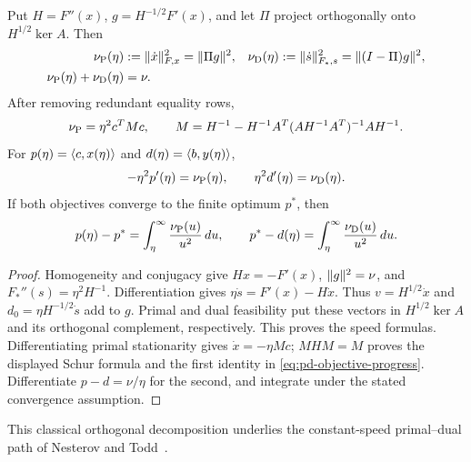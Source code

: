 \begin{proposition}
\label{prop:pd-velocity}
Put $H=F''(x)$, $g=H^{-1/2}F'(x)$, and let $\Pi$ project orthogonally
onto $H^{1/2}\ker A$. Then
\begin{align}
 \nu_{\rm P}(\eta)&:=\lVert \dot x\rVert_{F,x}^2=\lVert \Pi g\rVert^2,
 &\nu_{\rm D}(\eta)&:=\lVert \dot s\rVert_{F_*,s}^2
      =\lVert (I-\Pi)g\rVert^2,\notag\\
 \nu_{\rm P}(\eta)+\nu_{\rm D}(\eta)&=\nu.
 \label{eq:pd-velocity}
\end{align}
After removing redundant equality rows,
\[
 \nu_{\rm P}=\eta^2c^TMc,\qquad
 M=H^{-1}-H^{-1}A^T(AH^{-1}A^T)^{-1}AH^{-1}.
\]
For $p(\eta)=\langle c,x(\eta)\rangle$ and $d(\eta)=\langle b,y(\eta)\rangle$,
\begin{equation}\label{eq:pd-objective-progress}
 -\eta^2p'(\eta)=\nu_{\rm P}(\eta),\qquad
 \eta^2d'(\eta)=\nu_{\rm D}(\eta).
\end{equation}
If both objectives converge to the finite optimum $p^*$, then
\[
 p(\eta)-p^*=\int_\eta^\infty\frac{\nu_{\rm P}(u)}{u^2}\,du,
 \qquad
 p^*-d(\eta)=\int_\eta^\infty\frac{\nu_{\rm D}(u)}{u^2}\,du.
\]
\end{proposition}
\begin{proof}
Homogeneity and conjugacy give $Hx=-F'(x)$, $\lVert g\rVert^2=\nu$, and
$F_*''(s)=\eta^2H^{-1}$. Differentiation gives
$\eta\dot s=F'(x)-H\dot x$.
Thus $v=H^{1/2}\dot x$ and $d_0=\eta H^{-1/2}\dot s$ add to $g$.
Primal and dual feasibility put these vectors in $H^{1/2}\ker A$ and
its orthogonal complement, respectively. This proves the speed formulas.
Differentiating primal stationarity gives $\dot x=-\eta Mc$;
$MHM=M$ proves the displayed Schur formula and the first identity in
\eqref{eq:pd-objective-progress}. Differentiate $p-d=\nu/\eta$ for the
second, and integrate under the stated convergence assumption.
\end{proof}
This classical orthogonal decomposition underlies the
constant-speed primal--dual path of Nesterov and
Todd~\cite[Theorems~4.1 and~5.2]{NT2002}.

